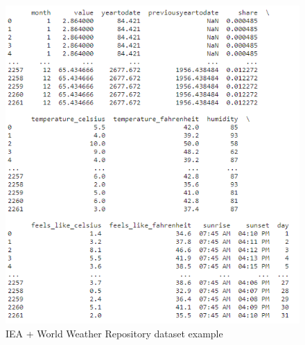 \documentclass[12pt]{article}
\begin{document}
\begin{figure}[h]
  \centering
  \includegraphics[width=0.5\linewidth]{Merged_df.png}
  \caption{IEA +  World Weather Repository dataset example}
  \label{fig:merged}
\end{figure}
\end{document}
